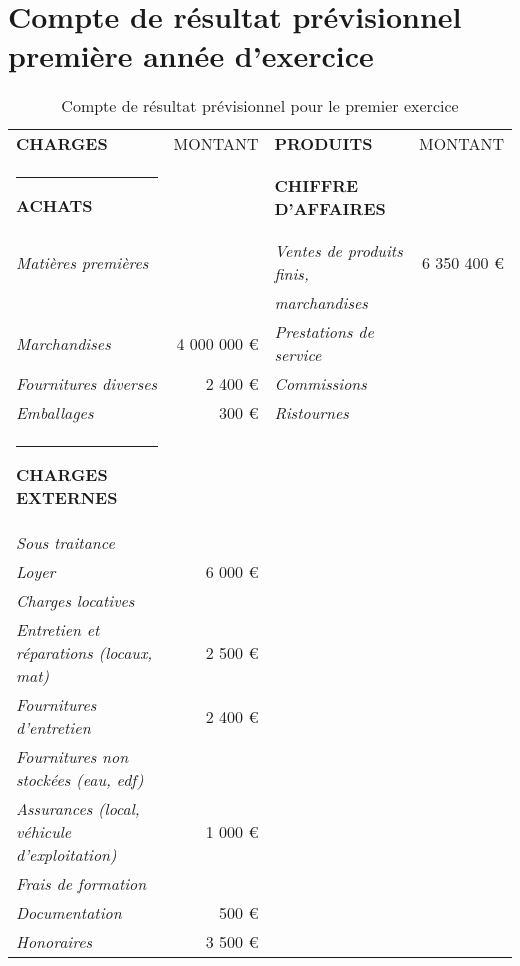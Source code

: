 \documentclass[12pt,a4paper]{report}
\begin{document}
	
	\section{Compte de résultat prévisionnel première année d'exercice}
		\begin{table}[h]
			\centering
			\caption{\color{green}Compte de résultat prévisionnel pour le premier exercice}
			\vspace{0.5cm}
			\begin{tabular}{l|r|l|r}
				\textbf{\color{green}CHARGES} & MONTANT & \textbf{\color{green}PRODUITS}& MONTANT\\
				\rule[0.5cm]{-0.1cm}{0cm}
				\textbf{\small \color{green}ACHATS} & & 		\textbf{\small \color{green}CHIFFRE D'AFFAIRES}	& \\
				\textit{Matières premières} & 	& \textit{Ventes de produits finis,} &	6 350 400 € \\
				& & \textit{marchandises} & \\
				\textit{Marchandises} &	4 000 000 € &	\textit{Prestations de service} & \\	
				\textit{Fournitures diverses}&	2 400 € & 	\textit{Commissions} & \\	
				\textit{Emballages} &	300 € & 	\textit{Ristournes} & \\
				\rule[0.5cm]{-0.1cm}{0cm}
				\textbf{\small \color{green}CHARGES EXTERNES} & & & \\		
				\textit{Sous traitance} 	& & & \\	
				\textit{Loyer} &	6 000 €  & & \\		
				\textit{Charges locatives} & & & \\		
				\textit{Entretien et réparations (locaux, mat)} & 	2 500 € & &  \\		
				\textit{Fournitures d'entretien} & 2 400 €  & & \\	
				\textit{Fournitures non stockées (eau, edf)} & & & \\			
				\textit{Assurances (local, véhicule d'exploitation)}& 1 000 € & & \\	
				\textit{Frais de formation} & & & \\			
				\textit{Documentation} &	500 €	 & & \\	
				\textit{Honoraires} &	3 500 € & &  \\		

\end{tabular}
\end{table}
\end{document}
